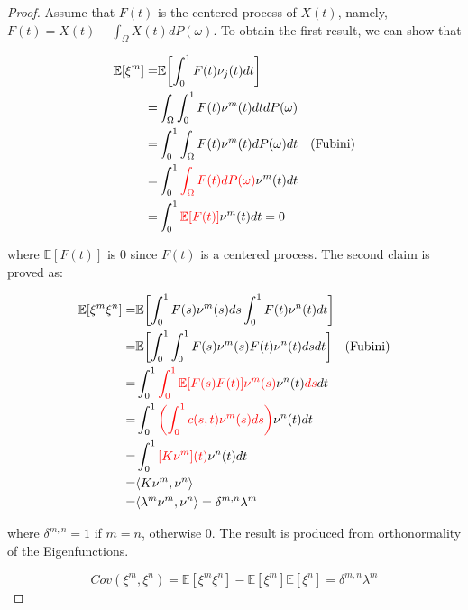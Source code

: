 \documentclass[11pt,twoside,a4paper]{article}
\begin{document}
	\begin{proof}
		Assume that $F(t)$ is the centered process of $X(t)$, namely, $F(t) = X(t) - \int_{\Omega}X(t)dP(\omega)$. To obtain the first result, we can show that
		
		\begin{equation}\label{Lemma1}
			\begin{split}
				\mathbb{E}[\xi^m] = & \mathbb{E} \biggl\lbrack \int_{0}^{1} F(t) \nu_{j}(t)dt\biggr\rbrack\\
				= & \int_{\Omega} \int_{0}^{1} F(t) \nu^m(t) dt dP(\omega)\\
				= & \int_{0}^{1} \int_{\Omega} F(t) \nu^m(t) dP(\omega) dt \quad \text{(Fubini)}\\
				= & \int_{0}^{1} {\color{red}\int_{\Omega} F(t) dP(\omega)} \nu^m(t) dt\\
				= & \int_{0}^{1} {\color{red}\mathbb{E}[F(t)]} \nu^m(t) dt = 0
			\end{split}
		\end{equation}
	
		where $\mathbb{E}[F(t)]$ is 0 since $F(t)$ is a centered process.
		The second claim is proved as:
		
		\begin{equation}\label{Lemma2}
			\begin{split}
				\mathbb{E} [\xi^m \xi^n] = & \mathbb{E}  \biggl\lbrack \int_{0}^{1} F(s) \nu^m(s)ds \int_{0}^{1} F(t) \nu^n(t)dt  \biggr\rbrack\\
				= & \mathbb{E} \biggl\lbrack {\int_{0}^{1} \int_{0}^{1} F(s) \nu^m(s) F(t) \nu^n(t) ds dt} \biggr\rbrack \quad \text{(Fubini)}\\
				= & \int_{0}^{1} {\color{red}\int_{0}^{1} \mathbb{E}[{F(s)F(t)}] \nu^m(s)} \nu^n(t) {\color{red}ds} dt\\
				= & \int_{0}^{1} {\color{red}\left(\int_{0}^{1}c(s,t)\nu^m(s)ds \right)} \nu^n(t) dt \\
				= & \int_{0}^{1}{\color{red}[K\nu^m](t)}\nu^n(t)dt\\
				= & \langle K \nu^m, \nu^n \rangle\\
				= & \langle \lambda^m \nu^m, \nu^n \rangle = \delta^{m,n}\lambda^{m}
			\end{split}
		\end{equation}
	
		where $\delta^{m,n} = 1$ if $m = n$, otherwise 0. The result is produced from orthonormality of the Eigenfunctions.
		
		\begin{equation}
			Cov\left(\xi^m, \xi^n\right) = \mathbb{E}[\xi^m \xi^n] - \mathbb{E}[\xi^m]\mathbb{E}[\xi^n] = \delta^{m,n}\lambda^{m}
		\end{equation}
	

\end{proof}
\end{document}
